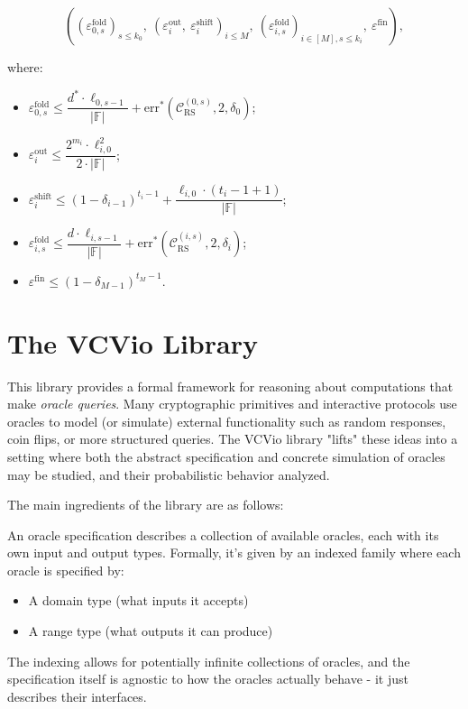 \begin{theorem}
    \[
((\varepsilon_{0,s}^{\mathrm{fold}})_{s \leq k_0},\ (\varepsilon_i^{\mathrm{out}},\ \varepsilon_i^{\mathrm{shift}})_{i \leq M},\ (\varepsilon_{i,s}^{\mathrm{fold}})_{i \in [M], s \leq k_i},\ \varepsilon^{\mathrm{fin}}),
\]

{where:}

\begin{itemize}
    \item $\varepsilon_{0,s}^{\mathrm{fold}} \leq \dfrac{d^* \cdot \ell_{0,s-1}}{|\mathbb{F}|} + \mathrm{err}^*(\mathcal{C}_{\mathrm{RS}}^{(0,s)}, 2, \delta_0)$;
    \item $\varepsilon_i^{\mathrm{out}} \leq \dfrac{2^{m_i} \cdot \ell_{i,0}^2}{2 \cdot |\mathbb{F}|}$;
    \item $\varepsilon_i^{\mathrm{shift}} \leq (1 - \delta_{i-1})^{t_i - 1} + \dfrac{\ell_{i,0} \cdot (t_i - 1 + 1)}{|\mathbb{F}|}$;
    \item $\varepsilon_{i,s}^{\mathrm{fold}} \leq \dfrac{d \cdot \ell_{i,s-1}}{|\mathbb{F}|} + \mathrm{err}^*(\mathcal{C}_{\mathrm{RS}}^{(i,s)}, 2, \delta_i)$;
    \item $\varepsilon^{\mathrm{fin}} \leq (1 - \delta_{M-1})^{t_M - 1}$.
\end{itemize}
\end{theorem}



\section{The VCVio Library}\label{sec:vcvio}

This library provides a formal framework for reasoning about computations that make \emph{oracle
queries}. Many cryptographic primitives and interactive protocols use oracles to model (or simulate)
external functionality such as random responses, coin flips, or more structured queries. The VCVio
library "lifts" these ideas into a setting where both the abstract specification and concrete
simulation of oracles may be studied, and their probabilistic behavior analyzed.

The main ingredients of the library are as follows:

\begin{definition}
    \label{def:oracle_spec}
    An oracle specification describes a collection of available oracles, each with its own input and output types. 
    Formally, it's given by an indexed family where each oracle is specified by:
    \begin{itemize}
        \item A domain type (what inputs it accepts)
        \item A range type (what outputs it can produce)
    \end{itemize}
    The indexing allows for potentially infinite collections of oracles, and the specification itself 
    is agnostic to how the oracles actually behave - it just describes their interfaces.
    \leanok
\end{definition}

